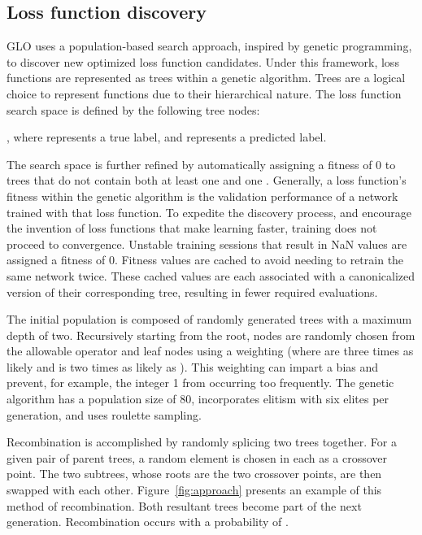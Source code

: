 \documentclass[conference]{IEEEtran}
\newcommand{\TECH}{GLO\xspace}
\begin{document}
\subsection{Loss function discovery}

\TECH uses a population-based search approach, inspired by genetic programming, to discover new optimized loss function candidates. Under this framework, loss functions are represented as trees within a genetic algorithm. Trees are a logical choice to represent functions due to their hierarchical nature. The loss function search space is defined by the following tree nodes: \begin{description}
\item[Unary Operators:]  \item[Binary Operators:] 
\item[Leaf Nodes:] , where  represents a true label, and  represents a predicted label.
\end{description}

The search space is further refined by automatically assigning a fitness of 0 to trees that do not contain both at least one  and one . Generally, a loss function's fitness within the genetic algorithm is the validation performance of a network trained with that loss function. To expedite the discovery process, and encourage the invention of loss functions that make learning faster, training does not proceed to convergence. Unstable training sessions that result in NaN values are assigned a fitness of 0. Fitness values are cached to avoid needing to retrain the same network twice. These cached values are each associated with a canonicalized version of their corresponding tree, resulting in fewer required evaluations.

The initial population is composed of randomly generated trees with a maximum depth of two. Recursively starting from the root, nodes are randomly chosen from the allowable operator and leaf nodes using a weighting (where  are three times as likely and  is two times as likely as ). This weighting can impart a bias and prevent, for example, the integer 1 from occurring too frequently. The genetic algorithm has a population size of 80, incorporates elitism with six elites per generation, and uses roulette sampling.

Recombination is accomplished by randomly splicing two trees together. For a given pair of parent trees, a random element is chosen in each as a crossover point. The two subtrees, whose roots are the two crossover points, are then swapped with each other. Figure~\ref{fig:approach} presents an example of this method of recombination. Both resultant trees become part of the next generation. Recombination occurs with a probability of .
\end{document}
